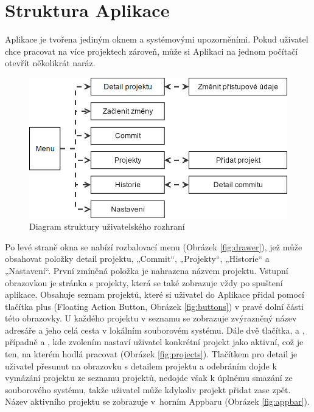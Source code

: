 \section{Struktura Aplikace}

Aplikace je tvořena jediným oknem a systémovými upozorněními. Pokud uživatel chce pracovat na více projektech zároveň, může si Aplikaci na jednom počítačí otevřít několikrát naráz.

\FloatBarrier
\begin{figure}[ht]
	\centering
	\includegraphics[width=\textwidth]{sections/ui/images/flow.png}
	\caption{Diagram struktury uživatelského rozhraní}
\end{figure}
\FloatBarrier

Po levé straně okna se nabízí rozbalovací menu (Obrázek \ref{fig:drawer}), jež může obsahovat položky detail projektu, „Commit“, „Projekty“, „Historie“ a „Nastavení“. První zmíněná položka je nahrazena názvem projektu. Vstupní obrazovkou je stránka s projekty, která se také zobrazuje vždy po spuštení aplikace. Obsahuje seznam projektů, které si uživatel do Aplikace přidal pomocí tlačítka plus (Floating Action Button, Obrázek \ref{fig:buttons}) v pravé dolní části této obrazovky. U každého projektu v seznamu se zobrazuje zvýrazněný název adresáře a jeho celá cesta v lokálním souborovém systému. Dále dvě tlačítka,  a , případně  a , kde zvolením nastaví uživatel konkrétní projekt jako aktivní, což je ten, na kterém hodlá pracovat (Obrázek \ref{fig:projects}). Tlačítkem pro detail je uživatel přesunut na obrazovku s detailem projektu a odebráním dojde k vymázání projektu ze seznamu projektů, nedojde však k úplnému smazání ze souborového systému, takže uživatel může kdykoliv projekt přidat zase zpět. Název aktivního projektu se zobrazuje v~horním Appbaru (Obrázek \ref{fig:appbar}).

